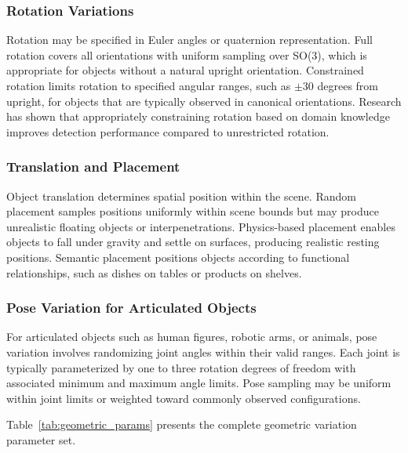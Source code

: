 \subsubsection{Rotation Variations}

Rotation may be specified in Euler angles or quaternion representation. Full rotation covers all orientations with uniform sampling over SO(3), which is appropriate for objects without a natural upright orientation. Constrained rotation limits rotation to specified angular ranges, such as $\pm30$ degrees from upright, for objects that are typically observed in canonical orientations. Research has shown that appropriately constraining rotation based on domain knowledge improves detection performance compared to unrestricted rotation.

\subsubsection{Translation and Placement}

Object translation determines spatial position within the scene. Random placement samples positions uniformly within scene bounds but may produce unrealistic floating objects or interpenetrations. Physics-based placement enables objects to fall under gravity and settle on surfaces, producing realistic resting positions. Semantic placement positions objects according to functional relationships, such as dishes on tables or products on shelves.

\subsubsection{Pose Variation for Articulated Objects}

For articulated objects such as human figures, robotic arms, or animals, pose variation involves randomizing joint angles within their valid ranges. Each joint is typically parameterized by one to three rotation degrees of freedom with associated minimum and maximum angle limits. Pose sampling may be uniform within joint limits or weighted toward commonly observed configurations.

Table~\ref{tab:geometric_params} presents the complete geometric variation parameter set.

